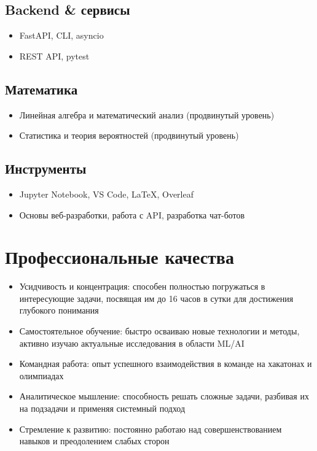 \documentclass[11pt,a4paper]{article}
\newcommand{\hlblue}[1]{\textcolor{pastelblue}{#1}}
\newcommand{\hlgreen}[1]{\textcolor{pastelgreen}{#1}}
\newcommand{\hlpurple}[1]{\textcolor{pastelpurple}{#1}}
\newcommand{\hlteal}[1]{\textcolor{pastelteal}{#1}}
\newcommand{\hlorange}[1]{\textcolor{pastelorange}{#1}}
\begin{document}
\subsection*{Backend \& сервисы}
\begin{itemize}
  \item FastAPI, CLI, asyncio
  \item REST API, pytest
\end{itemize}

\subsection*{Математика}
\begin{itemize}
  \item Линейная алгебра и математический анализ (продвинутый уровень)
  \item Статистика и теория вероятностей (продвинутый уровень)
\end{itemize}

\subsection*{Инструменты}
\begin{itemize}
  \item Jupyter Notebook, VS Code, LaTeX, Overleaf
  \item Основы веб-разработки, работа с API, разработка чат-ботов
\end{itemize}

\newpage

\section{Профессиональные качества}

\begin{itemize}
  \item \hlblue{Усидчивость и концентрация:} способен полностью погружаться в интересующие задачи, посвящая им до 16 часов в сутки для достижения глубокого понимания
  \item \hlgreen{Самостоятельное обучение:} быстро осваиваю новые технологии и методы, активно изучаю актуальные исследования в области ML/AI
  \item \hlpurple{Командная работа:} опыт успешного взаимодействия в команде на хакатонах и олимпиадах
  \item \hlteal{Аналитическое мышление:} способность решать сложные задачи, разбивая их на подзадачи и применяя системный подход
  \item \hlorange{Стремление к развитию:} постоянно работаю над совершенствованием навыков и преодолением слабых сторон
\end{itemize}
\end{document}
